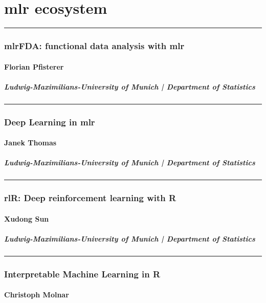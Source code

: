\documentclass [12pt]{article}
\begin{document}
\part{mlr ecosystem}
\noindent\rule{\textwidth}{1pt}
\section{mlrFDA: functional data analysis with mlr}
\subsection*{Florian Pfisterer}
\subsubsection*{Ludwig-Maximilians-University of Munich | Department of Statistics}

\noindent\rule{\textwidth}{1pt}
\section{Deep Learning in mlr}
\subsection*{Janek Thomas}
\subsubsection*{Ludwig-Maximilians-University of Munich | Department of Statistics}

\noindent\rule{\textwidth}{1pt}
\section{rlR: Deep reinforcement learning with R}
\subsection*{Xudong Sun}
\subsubsection*{Ludwig-Maximilians-University of Munich | Department of Statistics}

\noindent\rule{\textwidth}{1pt}
\section{Interpretable Machine Learning in R}
\subsection*{Christoph Molnar}
\end{document}
